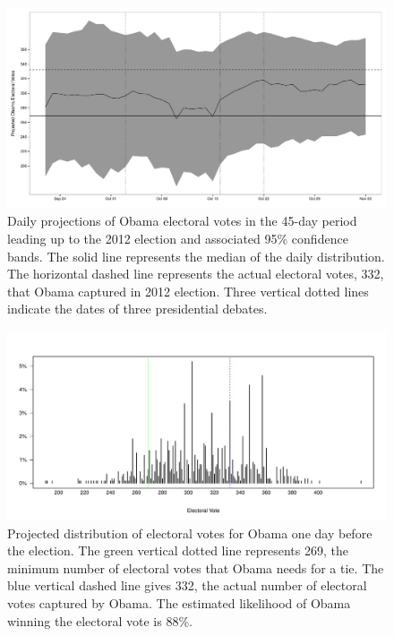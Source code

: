 \documentclass[preprint,authoryear,12pt]{elsarticle}
\begin{document}
\begin{figure}
  \centering
  \includegraphics[width=\textwidth]{electoral_vote_dist_over_time}
  \caption{Daily projections of Obama electoral votes in the 45-day period
    leading up to the 2012 election and associated 95\% confidence bands. The
    solid line represents the median of the daily distribution. The horizontal
    dashed line represents the actual electoral votes, 332, that Obama captured
    in 2012 election. Three vertical dotted lines indicate the dates of three
    presidential debates.}
  \label{fig:ev_daily}
\end{figure}

\begin{figure}
  \centering
  \includegraphics[width=\textwidth]{last_day_electoral_vote_dist}
  \caption{Projected distribution of electoral votes for Obama one day before the election. The green vertical dotted line represents 269, the minimum number of electoral votes that Obama needs for a tie. The blue vertical dashed line gives 332, the actual number of electoral votes captured by Obama. The estimated likelihood of Obama winning the electoral vote is 88\%.}
  \label{fig:ev_lastday}
\end{figure}
\end{document}
